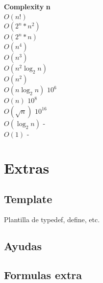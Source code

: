 \documentclass[10pt,landscape,twocolumn,a4paper,notitlepage]{article}
\newcommand\cppfile[2][]{

}
\begin{document}
\begin{tabbing}
\textbf{Complexity}\hspace{4cm} \=  \textbf{n}\hspace{3cm}   \\ 
$O(n!)$ \\ 
$O(2^{n}*n^{2})$ \\ 
$O(2^{n}*n)$ \\ 
$O(n^{4})$ \\ 
$O(n^{3})$ \\ 
$O(n^{2}\log_{2}n)$ \\ 
$O(n^{2})$ \\ 
$O(n\log_{2}n)$ \> $10^{6}$\\ 
$O(n)$ \> $10^{8}$\\ 
$O(\sqrt{n})$ \> $10^{16}$\\ 
$O(\log_{2}n)$ \> -\\ 
$O(1)$ \> -\\ 
\end{tabbing}




	\section{Extras}
		\subsection{Template}
			Plantilla de typedef, define, etc.
			\cppfile[1-29]{otros/template.cpp}
		
		\subsection{Ayudas}
			\cppfile[34-62]{otros/template.cpp}
		
		\subsection{Formulas extra}
			
\end{document}
